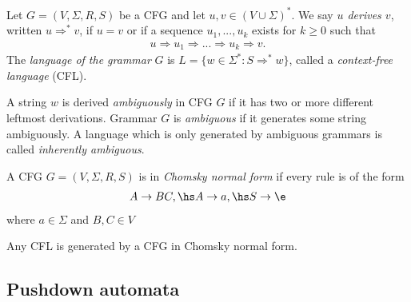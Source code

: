\documentclass{article}
\begin{document}
\begin{definition*}
	Let $G=(V,\Sigma,R,S)$ be a CFG and let $u,v\in(V\cup\Sigma)^*$.
	We say \emph{$u$ derives $v$}, written $u\Rightarrow^* v$, if $u=v$ or if a sequence
	$u_1,...,u_k$ exists for $k\geq 0$ such that
	\begin{align*}
		u\Rightarrow u_1 \Rightarrow ... \Rightarrow u_k \Rightarrow v.
	\end{align*}
	The \emph{language of the grammar} $G$ is $L=\{w\in\Sigma^*:S\Rightarrow^* w\}$,
	called a \emph{context-free language} (CFL).
\end{definition*}

\begin{definition*}
	A string $w$ is derived \emph{ambiguously} in CFG $G$ if it has
	two or more different leftmost derivations. Grammar $G$ is \emph{ambiguous} if it
	generates some string ambiguously.
	A language which is only generated by ambiguous grammars is called \emph{inherently
		ambiguous}.
\end{definition*}

\begin{definition*}
	A CFG $G=(V,\Sigma,R,S)$ is in \emph{Chomsky normal form} if every rule is of the
	form
	\begin{align*}
		A\to BC, \hs
		A\to a, \hs
		S\to\e
	\end{align*}
	where $a\in\Sigma$ and $B,C\in V$
\end{definition*}

\begin{theorem*}[Sipser p. 109]
	Any CFL is generated by a CFG in Chomsky normal form.
\end{theorem*}

\subsection{Pushdown automata}
\end{document}
